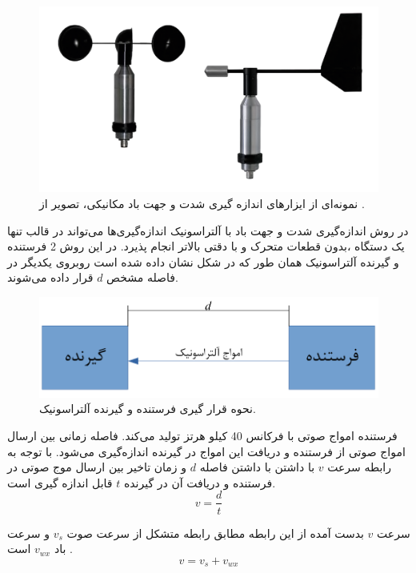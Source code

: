 \begin{figure}[!h]
	\centering
	\includegraphics[width=0.7\linewidth]{Assets/wind speed and direction meter.png}
	\caption{نمونه‌ای از ایزار‌های اندازه گیری شدت و جهت باد مکانیکی، تصویر از .}
	\label{fig:mechanicalWindSensor}
\end{figure}

در روش اندازه‌گیری شدت و جهت باد با آلتراسونیک اندازه‌گیری‌ها می‌تواند در قالب تنها یک دستگاه ،بدون قطعات متحرک و با دقتی بالاتر انجام پذیرد. در این روش 2 فرستنده و گیرنده آلتراسونیک همان طور که در شکل  نشان داده شده است روبروی یکدیگر در فاصله‌ مشخص $d$ قرار داده می‌شوند.

\begin{figure}[!h]
	\centering
	\includegraphics[width=0.7\linewidth]{Assets/ultrasonic one axis.pdf}
	\caption{نحوه قرار گیری فرستنده و گیرنده آلتراسونیک.}
	\label{fig:oneAxisUltrasonic}
\end{figure}

فرستنده امواج صوتی با فرکانس 40 کیلو هرتز تولید می‌کند. فاصله زمانی بین ارسال امواج صوتی از فرستنده و دریافت این امواج در گیرنده اندازه‌گیری می‌شود. با توجه به رابطه  سرعت $v$ با داشتن با داشتن فاصله $d$ و زمان تاخیر بین ارسال موج صوتی در فرستنده و دریافت آن در گیرنده  $t$ قابل اندازه گیری است.
\begin{equation}\label{eq:speed}
	v = \frac{d}{t}
\end{equation}

سرعت $v$ بدست آمده از این رابطه مطابق رابطه  متشکل از سرعت صوت $v_s$ و سرعت باد $v_{wx}$  است .
\begin{equation}\label{eq:expandSpeed}
	v = v_s + v_{wx}
\end{equation}

